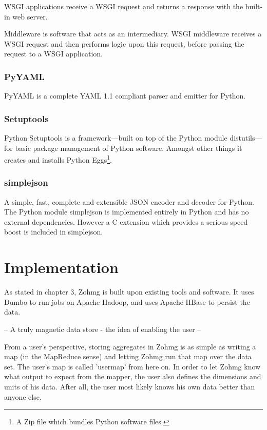 \documentclass[a4paper,10pt]{book}
\begin{document}
WSGI applications receive a WSGI request and returns a response with the
built-in web server.

Middleware is software that acts as an intermediary. WSGI middleware
receives a WSGI request and then performs logic upon this request, before
passing the request to a WSGI application. \cite{paste}


\subsection{PyYAML}

PyYAML is a complete YAML 1.1 compliant parser and emitter for Python.
\cite{pyyaml}


\subsection{Setuptools}

Python Setuptools is a framework---built on top of the Python module
distutils---for basic package management of Python software. Amongst other
things it creates and installs Python Eggs\footnote{A Zip file which
bundles Python software files.}. \cite{setuptools}


\subsection{simplejson}

A simple, fast, complete and extensible JSON encoder and decoder for
Python. The Python module simplejson is implemented entirely in Python and
has no external dependencies. However a C extension which provides a
serious speed boost is included in simplejson. \cite{simplejson}




\chapter{Implementation}

As stated in chapter 3, Zohmg is built upon existing tools and software. It
uses Dumbo to run jobs on Apache Hadoop, and uses Apache HBase to persist the
data.



-- A truly magnetic data store - the idea of enabling the user --

From a user's perspective, storing aggregates in Zohmg is as simple as writing
a map (in the MapReduce sense) and letting Zohmg run that map over the data
set. The user's map is called 'usermap' from here on. In order to let Zohmg
know what output to expect from the mapper, the user also defines the
dimensions and units of his data. After all, the user most likely knows his
own data better than anyone else.
\end{document}

